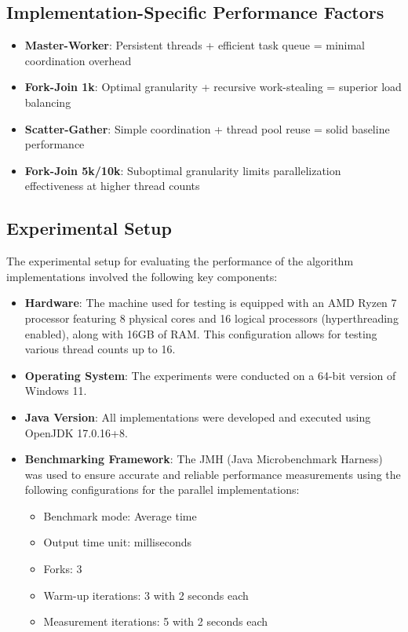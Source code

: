 \subsection{Implementation-Specific Performance Factors}

\begin{itemize}
   \item \textbf{Master-Worker}: Persistent threads + efficient task queue =
   minimal coordination overhead
   \item \textbf{Fork-Join 1k}: Optimal granularity + recursive work-stealing =
   superior load balancing
   \item \textbf{Scatter-Gather}: Simple coordination + thread pool reuse =
   solid baseline performance
   \item \textbf{Fork-Join 5k/10k}: Suboptimal granularity limits
   parallelization effectiveness at higher thread counts
\end{itemize}

\subsection{Experimental Setup}
The experimental setup for evaluating the performance of the algorithm
implementations involved the following key components:

\begin{itemize}
   \item \textbf{Hardware}: The machine used for testing is equipped with an AMD
   Ryzen 7 processor featuring 8 physical cores and 16 logical processors
   (hyperthreading enabled), along with 16GB of RAM. This configuration allows
   for testing various thread counts up to 16.
   \item \textbf{Operating System}: The experiments were conducted on a 64-bit
   version of Windows 11.
   \item \textbf{Java Version}: All implementations were developed and executed
   using OpenJDK 17.0.16+8.
   \item \textbf{Benchmarking Framework}: The JMH (Java Microbenchmark Harness)
   was used to ensure accurate and reliable performance measurements using the
   following configurations for the parallel implementations:
   \begin{itemize}
   \item Benchmark mode: Average time
   \item Output time unit: milliseconds
   \item Forks: 3
   \item Warm-up iterations: 3 with 2 seconds each
   \item Measurement iterations: 5 with 2 seconds each
   \end{itemize}
\end{itemize}